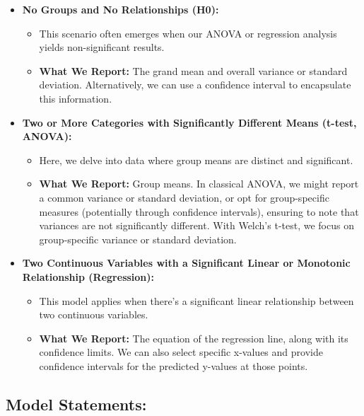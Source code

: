\documentclass[
  letterpaper,
  DIV=11,
  numbers=noendperiod]{scrreprt}
\providecommand{\tightlist}{%
  \setlength{\itemsep}{0pt}\setlength{\parskip}{0pt}}
\begin{document}
\begin{itemize}
\tightlist
\item
  \textbf{No Groups and No Relationships (H0):}

  \begin{itemize}
  \tightlist
  \item
    This scenario often emerges when our ANOVA or regression analysis
    yields non-significant results.
  \item
    \textbf{What We Report:} The grand mean and overall variance or
    standard deviation. Alternatively, we can use a confidence interval
    to encapsulate this information.
  \end{itemize}
\item
  \textbf{Two or More Categories with Significantly Different Means
  (t-test, ANOVA):}

  \begin{itemize}
  \tightlist
  \item
    Here, we delve into data where group means are distinct and
    significant.
  \item
    \textbf{What We Report:} Group means. In classical ANOVA, we might
    report a common variance or standard deviation, or opt for
    group-specific measures (potentially through confidence intervals),
    ensuring to note that variances are not significantly different.
    With Welch's t-test, we focus on group-specific variance or standard
    deviation.
  \end{itemize}
\item
  \textbf{Two Continuous Variables with a Significant Linear or
  Monotonic Relationship (Regression):}

  \begin{itemize}
  \tightlist
  \item
    This model applies when there's a significant linear relationship
    between two continuous variables.
  \item
    \textbf{What We Report:} The equation of the regression line, along
    with its confidence limits. We can also select specific x-values and
    provide confidence intervals for the predicted y-values at those
    points.
  \end{itemize}
\end{itemize}

\subsection{Model Statements:}\label{model-statements}
\end{document}
